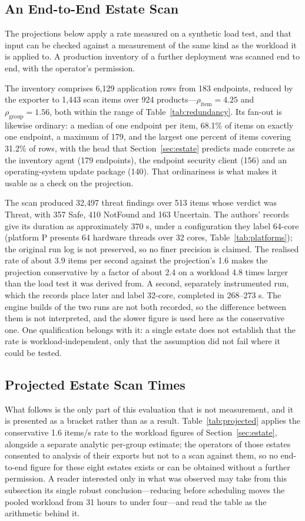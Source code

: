 \documentclass[fleqn,10pt,lineno]{wlpeerj}
\begin{document}
\subsection{An End-to-End Estate Scan}
\label{sec:e2e}
The projections below apply a rate measured on a synthetic load test, and that input can be checked against a measurement of the same kind as the workload it is applied to. A production inventory of a further deployment was scanned end to end, with the operator's permission.

The inventory comprises 6,129 application rows from 183 endpoints, reduced by the exporter to 1,443 scan items over 924 products---$\rho_{\text{item}} = 4.25$ and $\rho_{\text{group}} = 1.56$, both within the range of Table~\ref{tab:redundancy}. Its fan-out is likewise ordinary: a median of one endpoint per item, 68.1\% of items on exactly one endpoint, a maximum of 179, and the largest one percent of items covering 31.2\% of rows, with the head that Section~\ref{sec:estate} predicts made concrete as the inventory agent (179 endpoints), the endpoint security client (156) and an operating-system update package (140). That ordinariness is what makes it usable as a check on the projection.

The scan produced 32,497 threat findings over 513 items whose verdict was Threat, with 357 Safe, 410 NotFound and 163 Uncertain. The authors' records give its duration as approximately 370 s, under a configuration they label 64-core (platform P presents 64 hardware threads over 32 cores, Table~\ref{tab:platforms}); the original run log is not preserved, so no finer precision is claimed. The realised rate of about 3.9 items per second against the projection's 1.6 makes the projection conservative by a factor of about 2.4 on a workload 4.8 times larger than the load test it was derived from. A second, separately instrumented run, which the records place later and label 32-core, completed in 268--273 s. The engine builds of the two runs are not both recorded, so the difference between them is not interpreted, and the slower figure is used here as the conservative one. One qualification belongs with it: a single estate does not establish that the rate is workload-independent, only that the assumption did not fail where it could be tested.

\subsection{Projected Estate Scan Times}
What follows is the only part of this evaluation that is not measurement, and it is presented as a bracket rather than as a result. Table~\ref{tab:projected} applies the conservative 1.6 items/s rate to the workload figures of Section~\ref{sec:estate}, alongside a separate analytic per-group estimate; the operators of those estates consented to analysis of their exports but not to a scan against them, so no end-to-end figure for these eight estates exists or can be obtained without a further permission. A reader interested only in what was observed may take from this subsection its single robust conclusion---reducing before scheduling moves the pooled workload from 31 hours to under four---and read the table as the arithmetic behind it.
\end{document}
